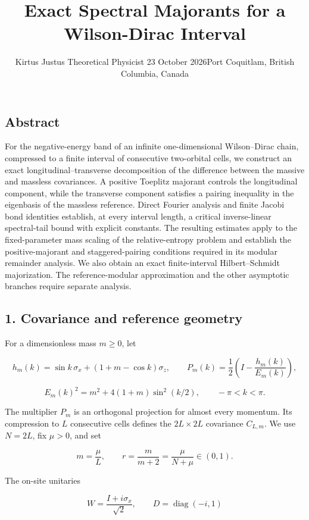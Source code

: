 \documentclass[
  10pt,
  a4paper,
]{article}
\title{Exact Spectral Majorants for a Wilson-Dirac Interval}
\author{Kirtus Justus \textbullet{} Theoretical Physicist \textbullet{} 23 October 2026\tabularnewline Port Coquitlam, British Columbia, Canada}
\date{}
\begin{document}
\maketitle

\subsection{Abstract}\label{abstract}

For the negative-energy band of an infinite one-dimensional Wilson--Dirac chain, compressed to a finite interval of consecutive two-orbital cells, we construct an exact longitudinal--transverse decomposition of the difference between the massive and massless covariances. A positive Toeplitz majorant controls the longitudinal component, while the transverse component satisfies a pairing inequality in the eigenbasis of the massless reference. Direct Fourier analysis and finite Jacobi bond identities establish, at every interval length, a critical inverse-linear spectral-tail bound with explicit constants. The resulting estimates apply to the fixed-parameter mass scaling of the relative-entropy problem and establish the positive-majorant and staggered-pairing conditions required in its modular remainder analysis. We also obtain an exact finite-interval Hilbert--Schmidt majorization. The reference-modular approximation and the other asymptotic branches require separate analysis.

\subsection{1. Covariance and reference geometry}\label{covariance-and-reference-geometry}

For a dimensionless mass \(m\ge0\), let

\[
 h_m(k)=\sin k\,\sigma_x+(1+m-\cos k)\sigma_z,\qquad
 P_m(k)=\frac12\left(I-\frac{h_m(k)}{E_m(k)}\right),
\]

\[
 E_m(k)^2=m^2+4(1+m)\sin^2(k/2),\qquad -\pi<k<\pi.
\]

The multiplier \(P_m\) is an orthogonal projection for almost every momentum. Its compression to \(L\) consecutive cells defines the \(2L\times2L\) covariance \(C_{L,m}\). We use \(N=2L\), fix \(\mu>0\), and set

\[
 m=\frac\mu L,\qquad r=\frac{m}{m+2}=\frac\mu{N+\mu}\in(0,1).
\]

The on-site unitaries

\[
 W=\frac{I+i\sigma_x}{\sqrt2},\qquad
 D=\operatorname{diag}(-i,1)
\]
\end{document}

